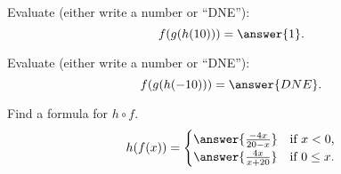 \documentclass{ximera}
\begin{document}
\begin{exercise}
  Evaluate (either write a number or ``DNE''):
  \[
  f(g(h(10))) = \answer{1}.
  \]
\end{exercise}
\begin{exercise}
  Evaluate (either write a number or ``DNE''):
  \[
  f(g(h(-10))) = \answer{DNE}.
  \]
\end{exercise}
\begin{exercise}
  Find a formula for $h\circ f$.
    \[
    h(f(x)) =
    \begin{cases}
      \answer{\frac{-4x}{20-x}} & \text{if $x<0$,}\\
      \answer{\frac{4x}{x+20}}  & \text{if $0\le x$.}
    \end{cases}
    \]
  \end{exercise}
\end{document}
